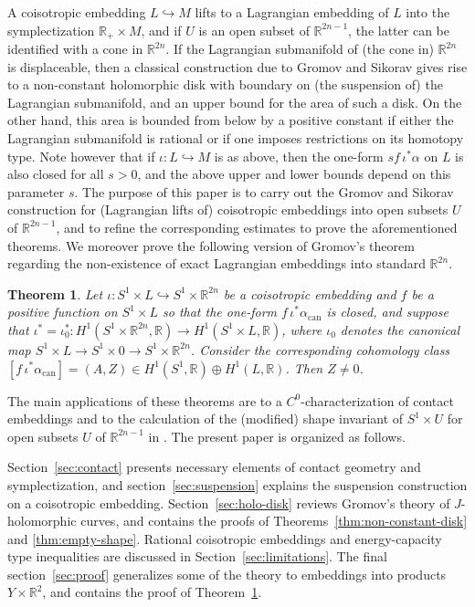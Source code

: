 \documentclass{amsart}
\newtheorem{thm}{Theorem}[section]
\theoremstyle{remark}
\def\R{{\mathbb R}}
\begin{document}
A coisotropic embedding $L \hookrightarrow M$ lifts to a Lagrangian embedding of $L$ into the symplectization $\R_+ \times M$, and if $U$ is an open subset of $\R^{2 n - 1}$, the latter can be identified with a cone in $\R^{2 n}$.
If the Lagrangian submanifold of (the cone in) $\R^{2 n}$ is displaceable, then a classical construction due to Gromov \cite{gromov:pcs85} and Sikorav \cite{sikorav:qpp91} gives rise to a non-constant holomorphic disk with boundary on (the suspension of) the Lagrangian submanifold, and an upper bound for the area of such a disk.
On the other hand, this area is bounded from below by a positive constant if either the Lagrangian submanifold is rational or if one imposes restrictions on its homotopy type.
Note however that if $\iota \colon L \hookrightarrow M$ is as above, then the one-form $s f \, \iota^* \alpha$ on $L$ is also closed for all $s > 0$, and the above upper and lower bounds depend on this parameter $s$.
The purpose of this paper is to carry out the Gromov and Sikorav construction for (Lagrangian lifts of) coisotropic embeddings into open subsets $U$ of $\R^{2 n - 1}$, and to refine the corresponding estimates to prove the aforementioned theorems.
We moreover prove the following version of Gromov's theorem regarding the non-existence of exact Lagrangian embeddings into standard $\R^{2 n}$.

\begin{thm} \label{thm:non-exact-coiso}
Let $\iota \colon S^1 \times L \hookrightarrow S^1 \times \R^{2 n}$ be a coisotropic embedding and $f$ be a positive function on $S^1 \times L$ so that the one-form $f \, \iota^* \alpha_{\textrm{can}}$ is closed, and suppose that $\iota^* = \iota_0^* \colon H^1 (S^1 \times \R^{2 n}, \R) \to H^1 (S^1 \times L, \R)$, where $\iota_0$ denotes the canonical map $S^1 \times L \to S^1 \times 0 \to S^1 \times \R^{2 n}$.
Consider the corresponding cohomology class $[f \, \iota^* \alpha_{\textrm{can}}] = (A, Z) \in H^1 (S^1, \R) \oplus H^1 (L, \R)$.
Then $Z \not= 0$.
\end{thm}

The main applications of these theorems are to a $C^0$-characterization of contact embeddings and to the calculation of the (modified) shape invariant of $S^1 \times U$ for open subsets $U$ of $\R^{2 n - 1}$ in \cite{mueller:csc16}.
The present paper is organized as follows.

Section~\ref{sec:contact} presents necessary elements of contact geometry and symplectization, and section~\ref{sec:suspension} explains the suspension construction on a coisotropic embedding.
Section~\ref{sec:holo-disk} reviews Gromov's theory of $J$-holomorphic curves, and contains the proofs of Theorems~\ref{thm:non-constant-disk} and \ref{thm:empty-shape}.
Rational coisotropic embeddings and energy-capacity type inequalities are discussed in Section~\ref{sec:limitations}.
The final section~\ref{sec:proof} generalizes some of the theory to embeddings into products $Y \times \R^2$, and contains the proof of Theorem~\ref{thm:non-exact-coiso}.
\end{document}
